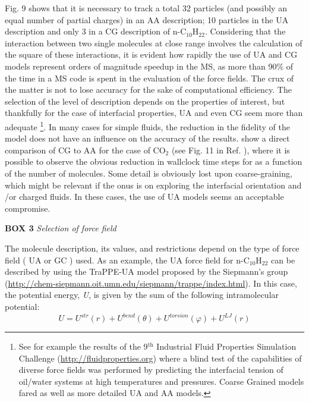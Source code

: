 \documentclass{scrbook}
\begin{document}
Fig. 9 shows that it is necessary to track a total 32 particles (and possibly
an equal number of partial charges) in an AA description; 10 particles in the
UA description and only 3 in a CG description of n-C$_{10}$H$_{22}$.
Considering that the interaction between two single molecules at close range
involves the calculation of the square of these interactions, it is evident how
rapidly the use of UA and CG models represent orders of magnitude speedup in
the MS, as more than 90\% of the time in a MS code is spent in the evaluation
of the force fields. The crux of the matter is not to lose accuracy for the
sake of computational efficiency. The selection of the level of description
depends on the properties of interest, but thankfully for the case of
interfacial properties, UA and even CG seem more than adequate
\footnote{See for example the results of the 9$^{\mathrm{th}}$
Industrial Fluid Properties Simulation Challenge
(\url{http://fluidproperties.org}) where a blind test of the capabilities of
diverse force fields was performed by predicting the interfacial tension of
oil/water systems at high temperatures and pressures. Coarse Grained models
\citet{herdes2018} fared as well as more detailed UA and AA models\citet{chen2018}.}.
In many cases for
simple fluids, the reduction in the fidelity of the model does not have an
influence on the accuracy of the results. 
\citet{avendano2011} show a direct comparison of CG to AA for the case of
CO$_{2}$ (see Fig. 11 in Ref. \citep{avendano2011}), where it is possible
to observe the obvious reduction in wallclock time steps for as a function of
the number of molecules. Some detail is obviously lost upon coarse-graining,
which might be relevant if the onus is on exploring the interfacial orientation
and /or charged fluids. In these cases, the use of UA models seems an
acceptable compromise. 

\textbf{BOX 3} \textit{Selection of force field}

The molecule description, its values, and restrictions depend on the type of
force field ( UA or GC ) used. As an example, the UA force field for
n-C$_{10}$H$_{22}$ can be described by using the TraPPE-UA model proposed by
the Siepmann's group (\url{http://chem-siepmann.oit.umn.edu/siepmann/trappe/index.html}).
In this case, the potential energy, \textit{U}, is given by the
sum of the following intramolecular potential:
\begin{equation}
U=U^{str}\left(r\right)+U^{bend}\left(\theta\right)+U^{torsion}\left(\varphi\right)+U^{LJ}\left(r\right)
\end{equation}
\end{document}

